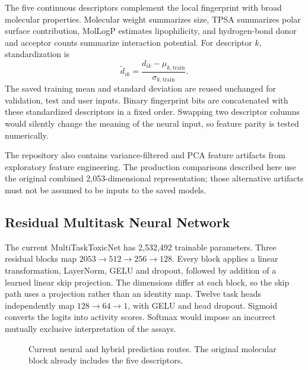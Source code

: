\documentclass[conference]{IEEEtran}
\begin{document}
The five continuous descriptors complement the local fingerprint with broad molecular properties. Molecular weight summarizes size, TPSA summarizes polar surface contribution, MolLogP estimates lipophilicity, and hydrogen-bond donor and acceptor counts summarize interaction potential. For descriptor $k$, standardization is
\begin{equation}
\widetilde d_{ik}=\frac{d_{ik}-\mu_{k,\mathrm{train}}}{\sigma_{k,\mathrm{train}}}.
\end{equation}
The saved training mean and standard deviation are reused unchanged for validation, test and user inputs. Binary fingerprint bits are concatenated with these standardized descriptors in a fixed order. Swapping two descriptor columns would silently change the meaning of the neural input, so feature parity is tested numerically.

The repository also contains variance-filtered and PCA feature artifacts from exploratory feature engineering. The production comparisons described here use the original combined 2,053-dimensional representation; those alternative artifacts must not be assumed to be inputs to the saved models.


\subsection{Residual Multitask Neural Network}
The current MultiTaskToxicNet has 2,532,492 trainable parameters. Three residual blocks map $2053\rightarrow512\rightarrow256\rightarrow128$. Every block applies a linear transformation, LayerNorm, GELU and dropout, followed by addition of a learned linear skip projection. The dimensions differ at each block, so the skip path uses a projection rather than an identity map. Twelve task heads independently map $128\rightarrow64\rightarrow1$, with GELU and head dropout. Sigmoid converts the logits into activity scores. Softmax would impose an incorrect mutually exclusive interpretation of the assays.

\begin{figure}[htbp]\centering
{}
\caption{Current neural and hybrid prediction routes. The original molecular block already includes the five descriptors.}
\label{fig:architecture}\end{figure}
\end{document}
